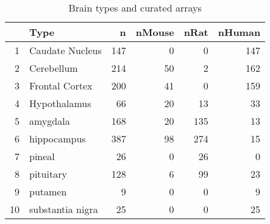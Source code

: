 \documentclass{article}
\begin{document}
\begin{table}[tbp]
\begin{center}
\begin{tabular}{rlrrrr}
  \hline
 & Type & n & nMouse & nRat & nHuman \\ 
  \hline
1 & Caudate Nucleus & 147 &   0 &   0 & 147 \\ 
  2 & Cerebellum & 214 &  50 &   2 & 162 \\ 
  3 & Frontal Cortex & 200 &  41 &   0 & 159 \\ 
  4 & Hypothalamus &  66 &  20 &  13 &  33 \\ 
  5 & amygdala & 168 &  20 & 135 &  13 \\ 
  6 & hippocampus & 387 &  98 & 274 &  15 \\ 
  7 & pineal &  26 &   0 &  26 &   0 \\ 
  8 & pituitary & 128 &   6 &  99 &  23 \\ 
  9 & putamen &   9 &   0 &   0 &   9 \\ 
  10 & substantia nigra &  25 &   0 &   0 &  25 \\ 
   \hline
\end{tabular}
\caption{Brain types and curated arrays}
\label{brainType}
\end{center}
\end{table}
\end{document}
